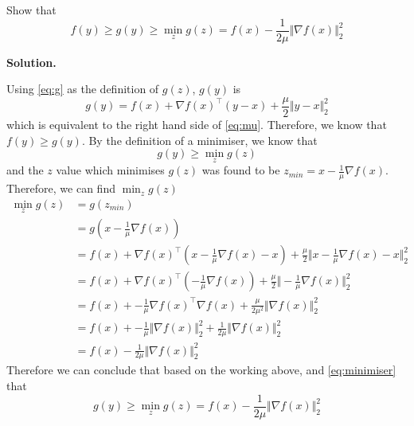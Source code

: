 \documentclass{exam}
\begin{document}
\begin{questions}
\begin{parts}
        \hr

        {
            Show that
            \begin{equation}\label{eq:min}
                f(y) \geq g(y) \geq \min_{z} g(z) = f(x) - \frac{1}{2\mu} \Vert \nabla f(x) \Vert^2_2
            \end{equation}

            \textbf{Solution.}

            Using \eqref{eq:g} as the definition of $g(z)$, $g(y)$ is
            \begin{equation}
                g(y) = f(x) + \nabla f(x) ^\top (y - x) + \frac{\mu}{2}\Vert y - x \Vert^2_2
            \end{equation}
            which is equivalent to the right hand side of \eqref{eq:mu}. Therefore, we know that $f(y) \geq g(y)$. By the definition of a minimiser, we know that
            \begin{equation}\label{eq:minimiser}
                g(y) \geq \min_{z} g(z)
            \end{equation}
            and the $z$ value which minimises $g(z)$ was found to be $z_{min} = x -\frac{1}{\mu}\nabla f(x)$. Therefore, we can find $\min_{z} g(z)$
            \begin{align*}
                \min_{z} g(z) & = g(z_{min})                                                                                                                \\
                              & = g\left(x -\frac{1}{\mu}\nabla f(x)\right)                                                                                 \\
                              & = f(x) + \nabla f(x) ^\top (x -\frac{1}{\mu}\nabla f(x) - x) + \frac{\mu}{2}\Vert x -\frac{1}{\mu}\nabla f(x) - x \Vert^2_2 \\
                              & = f(x) + \nabla f(x) ^\top (-\frac{1}{\mu}\nabla f(x)) + \frac{\mu}{2}\Vert -\frac{1}{\mu}\nabla f(x) \Vert^2_2             \\
                              & = f(x) + -\frac{1}{\mu}\nabla f(x) ^\top \nabla f(x) + \frac{\mu}{2 \mu^2}\Vert \nabla f(x) \Vert^2_2                       \\
                              & = f(x) + -\frac{1}{\mu} \Vert \nabla f(x) \Vert_2^2 + \frac{1}{2 \mu}\Vert \nabla f(x) \Vert^2_2                            \\
                              & = f(x) - \frac{1}{2 \mu}\Vert \nabla f(x) \Vert^2_2
            \end{align*}
            Therefore we can conclude that based on the working above, and \eqref{eq:minimiser} that
            \begin{equation}
                g(y) \geq \min_{z} g(z) = f(x) - \frac{1}{2 \mu}\Vert \nabla f(x) \Vert^2_2
            \end{equation}

}
\end{parts}
\end{questions}
\end{document}
